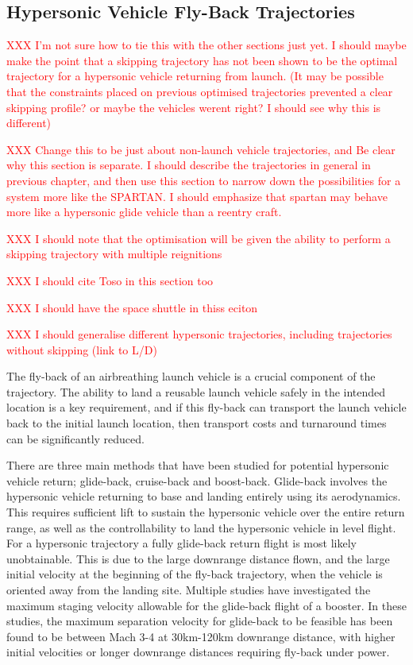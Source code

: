 \subsection{Hypersonic Vehicle Fly-Back Trajectories}
\textcolor{red}{XXX I'm not sure how to tie this with the other sections just yet. I should maybe make the point that a skipping trajectory has not been shown to be the optimal trajectory for a hypersonic vehicle returning from launch. (It may be possible that the constraints placed on previous optimised trajectories prevented a clear skipping profile? or maybe the vehicles werent right? I should see why this is different)}

\textcolor{red}{XXX Change this to be just about non-launch vehicle trajectories, and Be clear why this section is separate. I should describe the trajectories in general in previous chapter, and then use this section to narrow down the possibilities for a system more like the SPARTAN. I should emphasize that spartan may behave more like a hypersonic glide vehicle than a reentry craft. }

\textcolor{red}{XXX I should note that the optimisation will be given the ability to perform a skipping trajectory with multiple reignitions}

\textcolor{red}{XXX I should cite Toso in this section too}

\textcolor{red}{XXX  I should have the space shuttle in thiss eciton}

\textcolor{red}{XXX I should generalise different hypersonic trajectories, including trajectories without skipping (link to L/D)}

The fly-back of an airbreathing launch vehicle is a crucial component of the trajectory. The ability to land a reusable launch vehicle safely in the intended location is a key requirement, and if this fly-back can transport the launch vehicle back to the initial launch location, then transport costs and turnaround times can be significantly reduced. 

There are three main methods that have been studied for potential hypersonic vehicle return; glide-back, cruise-back and boost-back. Glide-back involves the hypersonic vehicle returning to base and landing entirely using its aerodynamics. This requires sufficient lift to sustain the hypersonic vehicle over the entire return range, as well as the controllability to land the hypersonic vehicle in level flight. 
For a hypersonic trajectory a fully glide-back return flight is most likely unobtainable. This is due to the large downrange distance flown, and the large initial velocity at the beginning of the fly-back trajectory, when the vehicle is oriented away from the landing site. Multiple studies have investigated the maximum staging velocity allowable for the glide-back flight of a booster. 
In these studies, the maximum separation velocity for glide-back to be feasible has been found to be between Mach 3-4 at 30km-120km downrange distance, with higher initial velocities or longer downrange distances requiring fly-back under power\cite{Hellman,Tetlow1992}.

